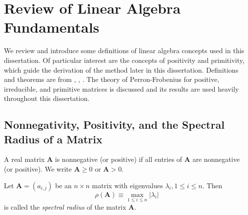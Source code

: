 
\section{Review of Linear Algebra Fundamentals}
\label{sec:LinAlg}

We review and introduce some definitions of linear algebra concepts used in this dissertation. Of particular interest are the concepts of positivity and primitivity, which guide the derivation of the method later in this dissertation. Definitions and theorems are from \cite{horn_matrix_2012}, \cite{birkhoff_mathematical_1961}, \cite{varga_matrix_2009}. The theory of Perron-Frobenius for positive, irreducible, and primitive matrices is discussed and its results are used heavily throughout this dissertation.

\subsection{Nonnegativity, Positivity, and the Spectral Radius of a Matrix}

\begin{definition}
A real matrix $\mathbf{A}$ is nonnegative (or positive) if all entries of $\mathbf{A}$ are nonnegative (or positive). We write  $\mathbf{A} \ge 0$ or $\mathbf{A} > 0$.
\end{definition}

\begin{definition}
Let $\mathbf{A} = (a_{i,j})$ be an $n \times n$ matrix with eigenvalues $\lambda_{i}, 1 \le i \le n$. Then
	\begin{equation*}
		\rho(\mathbf{A}) \equiv \max_{1 \le i \le n} |\lambda_{i}|
	\end{equation*}
is called the \textit{spectral radius} of the matrix $\mathbf{A}$.
\end{definition}
		
